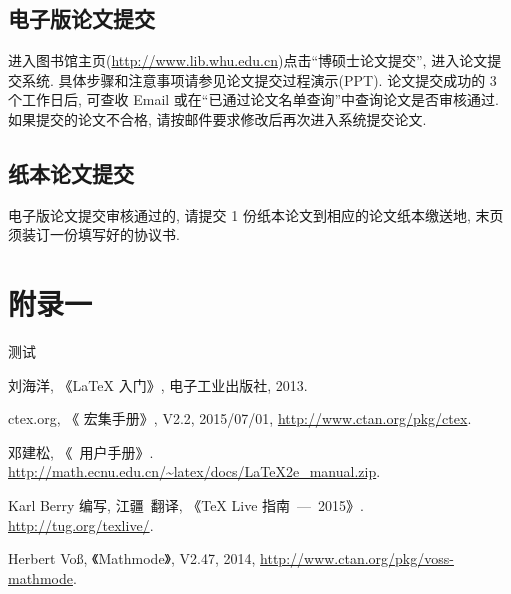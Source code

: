 \documentclass{ice_report}  %
\begin{document}
\section*{电子版论文提交}

    进入图书馆主页(\url{http://www.lib.whu.edu.cn})点击``博硕士论文提交'', 进入论文提交系统.
    具体步骤和注意事项请参见论文提交过程演示(PPT).
    论文提交成功的 3 个工作日后, 可查收 Email 或在``已通过论文名单查询''中查询论文是否审核通过.
    如果提交的论文不合格, 请按邮件要求修改后再次进入系统提交论文.


\section*{纸本论文提交}

    电子版论文提交审核通过的, 请提交 1 份纸本论文到相应的论文纸本缴送地,
    末页须装订一份填写好的协议书.

\appendix

\chapter{附录一}

测试



\cleardoublepage{}
{}
\begin{thebibliography}{000}

   刘海洋, 《\LaTeX{} 入门》, 电子工业出版社, 2013.

   ctex.org, 《\CTeX{} 宏集手册》, V2.2, 2015/07/01, \url{http://www.ctan.org/pkg/ctex}.

   邓建松, 《\LaTeXe~用户手册》.
             \url{http://math.ecnu.edu.cn/~latex/docs/LaTeX2e_manual.zip}.

   Karl Berry 编写, 江疆~翻译, 《\TeX{} Live 指南\ —\ 2015》.
              \url{http://tug.org/texlive/}.

   Herbert Vo\ss, 《Mathmode》, V2.47, 2014, \url{http://www.ctan.org/pkg/voss-mathmode}.

\end{thebibliography}




\backmatter


\cleardoublepage
\end{document}
